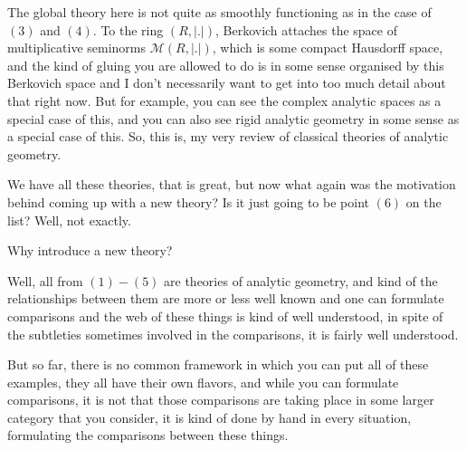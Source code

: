 The global theory here is not quite as smoothly functioning as in the case of $(3)$ and $(4)$. To the ring $(R, |.|)$, Berkovich attaches the space of multiplicative seminorms $\mathcal{M}(R, |.|)$, which is some compact Hausdorff space, and the kind of gluing you are allowed to do is in some sense organised by this Berkovich space and I don't necessarily want to get into too much detail about that right now. But for example, you can see the complex analytic spaces as a special case of this, and you can also see rigid analytic geometry in some sense as a special case of this. So, this is, my very review of classical theories of analytic geometry.



We have all these theories, that is great, but now what again was the motivation behind coming up with a new theory? Is it just going to be point $(6)$ on the list? Well, not exactly.

\begin{question}
    Why introduce a new theory?
\end{question}

Well, all from $(1) - (5)$ are theories of analytic geometry, and kind of the relationships between them are more or less well known and one can formulate comparisons and the web of these things is kind of well understood, in spite of the subtleties sometimes involved in the comparisons, it is fairly well understood.

But so far, there is no common framework in which you can put all of these examples, they all have their own flavors, and while you can formulate comparisons, it is not that those comparisons are taking place in some larger category that you consider, it is kind of done by hand in every situation, formulating the comparisons between these things.

